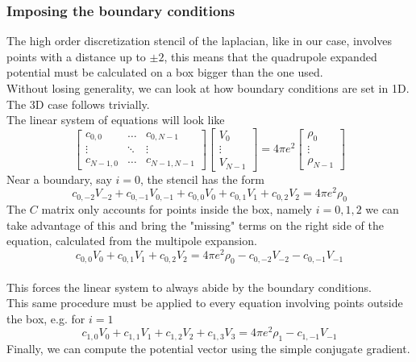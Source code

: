\subsubsection{Imposing the boundary conditions}
The high order discretization stencil of the laplacian, like in our case, involves points with a distance up to $\pm 2$, this means that the quadrupole expanded potential must be calculated on a box bigger than the one used.
\\Without losing generality, we can look at how boundary conditions are set in 1D. The 3D case follows trivially.
\\The linear system of equations will look like
\[
\begin{bmatrix}
    c_{0,0} & \ldots & c_{0,N-1} \\
    \vdots & \ddots & \vdots \\
    c_{N-1,0} & \ldots & c_{N-1,N-1}
\end{bmatrix}
\begin{bmatrix}
    V_0 \\ \vdots \\ V_{N-1}
\end{bmatrix}
=
4\pi e^2
\begin{bmatrix}
    \rho_0 \\ \vdots \\ \rho_{N-1}
\end{bmatrix}
\]
Near a boundary, say $i=0$, the stencil has the form
\begin{equation}
    c_{0,-2}V_{-2} + c_{0,-1}V_{0,-1} + c_{0,0}V_0 + c_{0,1}V_1 + c_{0,2}V_2 = 4\pi e^2 \rho_0
\end{equation}
The $C$ matrix only accounts for points inside the box, namely $i=0, 1, 2$ we can take advantage of this and bring the "missing" terms on the right side of the equation, calculated from the multipole expansion.
\[
c_{0,0} V_0 + c_{0,1} V_1 + c_{0,2} V_2 = 4\pi e^2 \rho_0 - c_{0,-2}V_{-2} - c_{0,-1}V_{-1}
\]
\\This forces the linear system to always abide by the boundary conditions.
\\This same procedure must be applied to every equation involving points outside the box, e.g. for $i=1$
\[
c_{1,0} V_0 + c_{1,1} V_1 + c_{1,2} V_2 + c_{1,3} V_3 = 4\pi e^2 \rho_1 - c_{1,-1}V_{-1} 
\]
Finally, we can compute the potential vector using the simple conjugate gradient.
